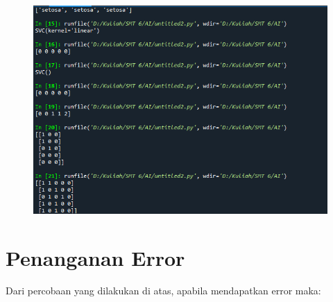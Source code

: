 \begin{enumerate}
\begin{figure}[!htbp]
			\includegraphics[scale=0.6]{figures/5.2.PNG}
		\end{figure}
\end{enumerate}

\newpage
\section{Penanganan Error}
Dari percobaan yang dilakukan di atas, apabila mendapatkan error maka:


